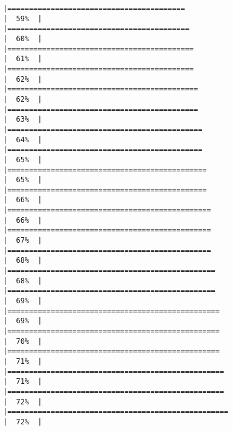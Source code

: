 \documentclass[
]{article}
\begin{document}
\begin{verbatim}
|=========================================                             |  59%  |                                                                              |==========================================                            |  60%  |                                                                              |===========================================                           |  61%  |                                                                              |===========================================                           |  62%  |                                                                              |============================================                          |  62%  |                                                                              |============================================                          |  63%  |                                                                              |=============================================                         |  64%  |                                                                              |=============================================                         |  65%  |                                                                              |==============================================                        |  65%  |                                                                              |==============================================                        |  66%  |                                                                              |===============================================                       |  66%  |                                                                              |===============================================                       |  67%  |                                                                              |===============================================                       |  68%  |                                                                              |================================================                      |  68%  |                                                                              |================================================                      |  69%  |                                                                              |=================================================                     |  69%  |                                                                              |=================================================                     |  70%  |                                                                              |=================================================                     |  71%  |                                                                              |==================================================                    |  71%  |                                                                              |==================================================                    |  72%  |                                                                              |===================================================                   |  72%  |                                                                              
\end{verbatim}
\end{document}
